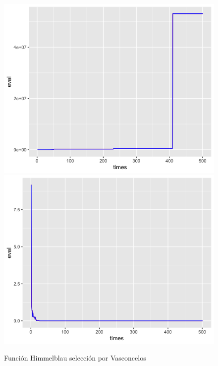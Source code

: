 \documentclass[letterpaper,12pt]{article}
\theoremstyle{definition}
\begin{document}
\begin{figure}[H]
    \includegraphics[width=\linewidth]{him_vas_fitness}
  \endminipage\hfill
    \includegraphics[width=\linewidth]{him_vas_eval}
  \endminipage\hfill
  \caption{Función Himmelblau selección por Vasconcelos}
  \label{fig:him_vas}
\end{figure}
\end{document}

